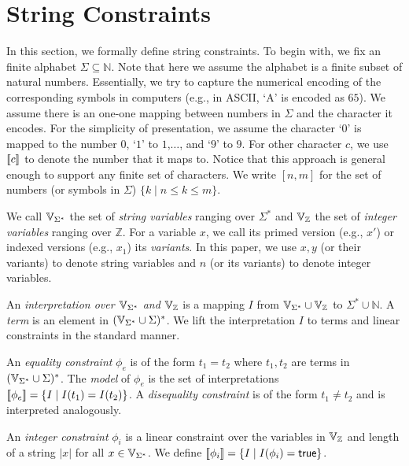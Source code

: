 \documentclass[sigplan,review,anonymous]{acmart}\settopmatter{printfolios=true,printccs=false,printacmref=false}
\begin{document}
\section{String Constraints} \label{section:sc}


In this section, we formally define string constraints. To begin with, we fix an finite alphabet $\Sigma \subseteq \mathbb{N}$. Note that here we assume the alphabet is a finite subset of natural numbers. Essentially, we try to capture the numerical encoding of the corresponding symbols in computers (e.g., in ASCII, `A' is encoded as $65$). We assume there is an one-one mapping between numbers in $\Sigma$ and the character it encodes. For the simplicity of presentation, we assume the character `$0$' is mapped to the number $0$, `$1$' to $1$,$\ldots$, and `$9$' to $9$. For other character $c$, we use $[\![c]\!]$ to denote the number that it maps to. Notice that this approach is general enough to support any finite set of characters. We write $[n,m]$ for the set of numbers (or symbols in $\Sigma$) $\{k\mid n\leq k \leq m\}$. 


We call $\mbox{$\mathbb{V}_{\Sigma^*}$}$ the set of \emph{string variables} ranging over $\Sigma^*$ and $\mbox{$\mathbb{V}_{\mathbb{Z}}$}$ the set of \emph{integer variables} ranging over $\mathbb{Z}$.
For a variable $x$, we call its primed version (e.g., $x'$) or indexed versions (e.g., $x_1$) its \emph{variants}.
In this paper, we use $x,y$ (or their variants) to denote string variables and $n$ (or its variants) to denote integer variables.

An \emph{interpretation over $\mbox{$\mathbb{V}_{\Sigma^*}$}$ and $\mbox{$\mathbb{V}_{\mathbb{Z}}$}$} is a mapping $I$ from $\mbox{$\mathbb{V}_{\Sigma^*}$}\cup \mbox{$\mathbb{V}_{\mathbb{Z}}$}$ to $\Sigma^* \cup \mathbb{N}$. A \emph{term} is an element in $(\mbox{$\mathbb{V}_{\Sigma^*}$}\cup \Sigma)^*$. We lift the interpretation $I$ to terms and linear constraints in the standard manner. 

An \emph{equality constraint} $\phi_e$ is of the form $t_1 = t_2$ where $t_1, 
t_2$ are terms in $(\mbox{$\mathbb{V}_{\Sigma^*}$}\cup \Sigma)^*$. The \emph{model} of $\phi_e$ is the set of interpretations $[\![\phi_e]\!]=\{I\mid 
I(t_1)=I(t_2)\}$. A \emph{disequality constraint} is of the form $t_1 \neq 
t_2$ and is interpreted analogously.

An \emph{integer constraint} $\phi_i$ is a linear constraint over the variables in $\mbox{$\mathbb{V}_{\mathbb{Z}}$}$ and length of a string $|x|$ for all $x \in \mbox{$\mathbb{V}_{\Sigma^*}$}$.
We define  $[\![\phi_i]\!]= \{I \mid I(\phi_i)= \mbox{$\mathsf{true}$} \}$.
\end{document}
